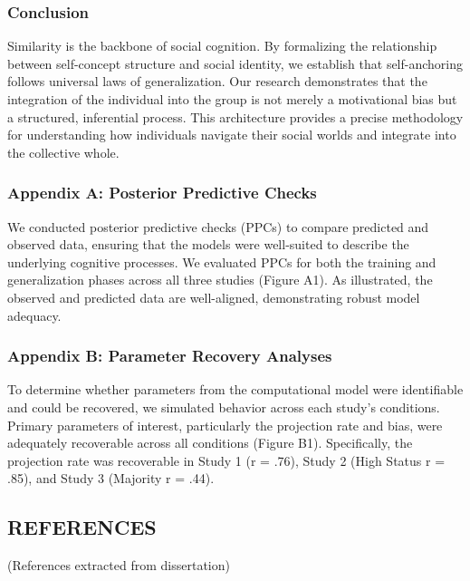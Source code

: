 \documentclass[
  man,
  longtable,
  nolmodern,
  notxfonts,
  notimes,
  man]{apa7}
\begin{document}
\subsubsection{Conclusion}\label{conclusion}

Similarity is the backbone of social cognition. By formalizing the
relationship between self-concept structure and social identity, we
establish that self-anchoring follows universal laws of generalization.
Our research demonstrates that the integration of the individual into
the group is not merely a motivational bias but a structured,
inferential process. This architecture provides a precise methodology
for understanding how individuals navigate their social worlds and
integrate into the collective whole.

\subsubsection{Appendix A: Posterior Predictive
Checks}\label{appendix-a-posterior-predictive-checks}

We conducted posterior predictive checks (PPCs) to compare predicted and
observed data, ensuring that the models were well-suited to describe the
underlying cognitive processes. We evaluated PPCs for both the training
and generalization phases across all three studies (Figure A1). As
illustrated, the observed and predicted data are well-aligned,
demonstrating robust model adequacy.

\subsubsection{Appendix B: Parameter Recovery
Analyses}\label{appendix-b-parameter-recovery-analyses}

To determine whether parameters from the computational model were
identifiable and could be recovered, we simulated behavior across each
study's conditions. Primary parameters of interest, particularly the
projection rate and bias, were adequately recoverable across all
conditions (Figure B1). Specifically, the projection rate was
recoverable in Study 1 (r = .76), Study 2 (High Status r = .85), and
Study 3 (Majority r = .44).

\subsection{REFERENCES}\label{references}

(References extracted from dissertation)
\end{document}
